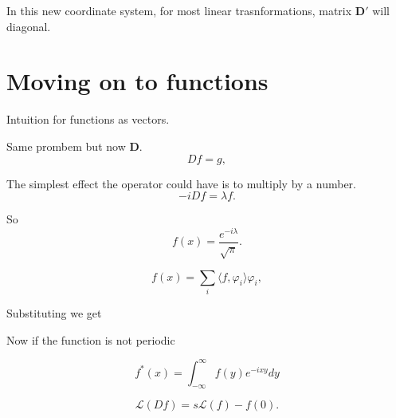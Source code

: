 \documentclass{article}
\begin{document}
In this new coordinate system, for most linear trasnformations, matrix \(\bm D'\) will diagonal.

\section{Moving on to functions}

Intuition for functions as vectors.

Same prombem but now \(\bm D\).
\[D f = g,\]

The simplest effect the operator could have is to multiply by a number.
\[-iD f = \lambda f.\]

So
\[f(x) = \frac{e^{-i\lambda}}{\sqrt{\pi}}.\]

\[f(x) = \sum_i \langle f, \varphi_i\rangle \varphi_i,\]


Substituting we get


Now if the function is not periodic 

\[f^*(x) = \int_{-\infty}^{\infty} f(y) e^{-ixy} dy\]


\[\mathcal L (D f) = s\mathcal L(f) - f(0).\]
\end{document}
